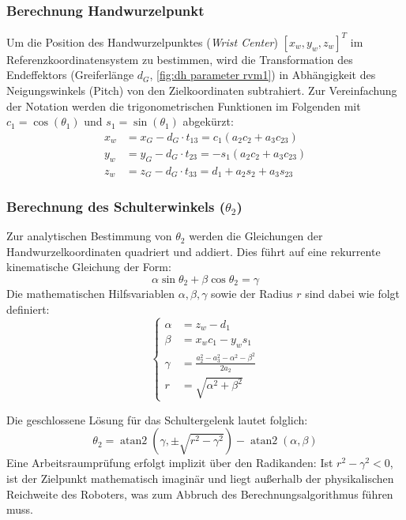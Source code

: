 \subsubsection*{Berechnung Handwurzelpunkt}
Um die Position des Handwurzelpunktes (\textit{Wrist Center}) $[x_w, y_w, z_w]^T$ im Referenzkoordinatensystem zu bestimmen, wird die Transformation des Endeffektors (Greiferlänge $d_G$, \ref{fig:dh parameter rvm1}) in Abhängigkeit des Neigungswinkels (Pitch) von den Zielkoordinaten subtrahiert. Zur Vereinfachung der Notation werden die trigonometrischen Funktionen im Folgenden mit $c_1 = \cos(\theta_1)$ und $s_1 = \sin(\theta_1)$ abgekürzt:
\begin{align}
	x_w &= x_G - d_G \cdot t_{13} = c_1 (a_2 c_2 + a_3 c_{23}) \\
	y_w &= y_G - d_G \cdot t_{23} = -s_1 (a_2 c_2 + a_3 c_{23}) \\
	z_w &= z_G - d_G \cdot t_{33} = d_1 + a_2 s_2 + a_3 s_{23}
\end{align}
\subsubsection*{Berechnung des Schulterwinkels ($\theta_2$)}
Zur analytischen Bestimmung von $\theta_2$ werden die Gleichungen der Handwurzelkoordinaten quadriert und addiert. Dies führt auf eine rekurrente kinematische Gleichung der Form:
\begin{equation}
	\alpha \sin\theta_2 + \beta \cos\theta_2 = \gamma
\end{equation}
Die mathematischen Hilfsvariablen $\alpha, \beta, \gamma$ sowie der Radius $r$ sind dabei wie folgt definiert:
\begin{equation}
	\left\{
	\begin{aligned}
		\alpha &= z_w - d_1 \\
		\beta &= x_w c_1 - y_w s_1 \\
		\gamma &= \frac{a_2^2 - a_3^2 - \alpha^2 - \beta^2}{2a_2} \\
		r &= \sqrt{\alpha^2 + \beta^2}
	\end{aligned}
	\right.
\end{equation}

Die geschlossene Lösung für das Schultergelenk lautet folglich:
\begin{equation}
	\theta_2 = \operatorname{atan2}\left(\gamma, \pm\sqrt{r^2 - \gamma^2}\right) - \operatorname{atan2}(\alpha, \beta)
\end{equation}
Eine Arbeitsraumprüfung erfolgt implizit über den Radikanden: Ist $r^2 - \gamma^2 < 0$, ist der Zielpunkt mathematisch imaginär und liegt außerhalb der physikalischen Reichweite des Roboters, was zum Abbruch des Berechnungsalgorithmus führen muss.

